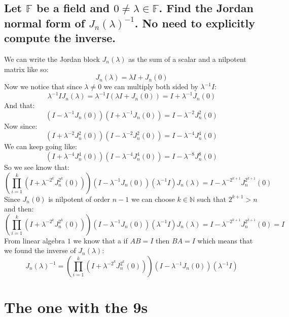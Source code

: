\documentclass[11pt,a4paper]{article}
\theoremstyle{plain}
\newcommand{\N}{\mathbb{N}}
\newcommand{\F}{\mathbb{F}}
\begin{document}
	\subsection{Let $\F$ be a field and $0\neq\lambda\in\F$. Find the Jordan 
	normal form of $J_n(\lambda)^{-1}$. No need to explicitly compute the
	inverse.}
	We can write the Jordan block $J_n(\lambda)$ as the sum of a scalar and
	a nilpotent matrix like so:
	\[
		J_n(\lambda) = \lambda I + J_n(0)
	\]
	Now we notice that since $\lambda \neq 0$ we can multiply both sided by 
	$\lambda^{-1} I$:
	\[
		\lambda^{-1} I J_n(\lambda) =\lambda^{-1} I(\lambda I + J_n(0)) = 
		I + \lambda^{-1}J_n(0)
	\]
	And that:
	\[
		(I - \lambda^{-1}J_n(0))(I + \lambda^{-1}J_n(0)) = 
		I - \lambda^{-2}J_n^2(0)
	\]
	Now since:
	\[
		(I + \lambda^{-2}J_n^2(0))(I - \lambda^{-2}J_n^2(0)) = 
		I - \lambda^{-4}J_n^4(0)
	\]
	We can keep going like:
	\[
		(I + \lambda^{-4}J_n^4(0))(I - \lambda^{-4}J_n^4(0)) = 
		I - \lambda^{-8}J_n^8(0)
	\]
	So we see know that:
	\[
		\left(\prod_{i=1}^{k}{(I + \lambda^{-2^k}J_n^{2^k}(0))}\right)
		(I - \lambda^{-1}J_n(0))(\lambda^{-1} I)J_n(\lambda) = I - \lambda^{-2^{k+1}}
		J_n^{2^{k+1}}(0)
	\]
	Since $J_n(0)$ is nilpotent of order $n-1$ we can choose $k\in\N$ such that
	$2^{k+1} > n$ and then:
	\[
		\left(\prod_{i=1}^{k}{(I + \lambda^{-2^k}J_n^{2^k}(0))}\right)
		(I - \lambda^{-1}J_n(0))(\lambda^{-1} I)J_n(\lambda) = I - \lambda^{-2^{k+1}}
		J_n^{2^{k+1}}(0) = I
	\]
	From linear algebra $1$ we know that a if $AB=I$ then $BA=I$ which means
	that we found the inverse of $J_n(\lambda)$:
	\[
		J_n(\lambda)^{-1} = 
		\left(\prod_{i=1}^{k}{(I + \lambda^{-2^k}J_n^{2^k}(0))}
		\right)(I - \lambda^{-1}J_n(0))(\lambda^{-1} I)
	\]

	\newpage

	\section{The one with the 9s}
\end{document}
